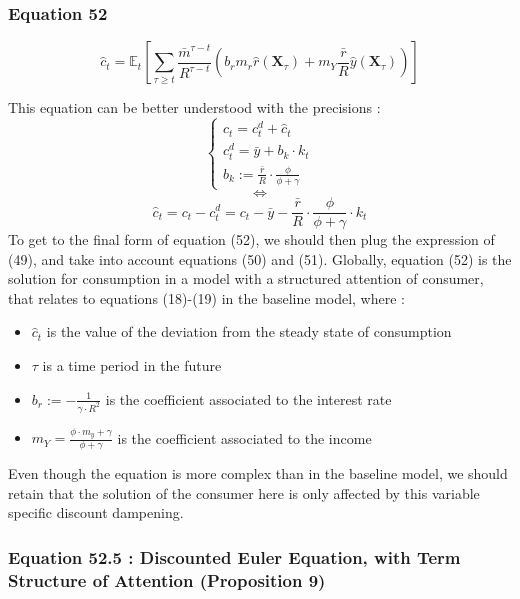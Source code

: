 \documentclass{article}
\begin{document}
\subsubsection*{Equation 52}

\begin{equation}\tag{52}
        \hat{c}_{t}=\mathbb{E}_{t}\left[\sum_{\tau\geq t}\frac{\bar{m}^{\tau-t}}{R^{\tau-t}}\left(b_{r}m_{r}\hat{r}(\textbf{X}_{\tau})+m_{Y}\frac{\bar{r}}{R}\hat{y}(\textbf{X}_{\tau})\right)\right]
\end{equation}

This equation can be better understood with the precisions : 
\begin{equation*}
    \begin{cases}
        c_{t}=c_{t}^{d}+\hat{c}_{t} \\ 
        c^{d}_{t} = \bar{y} + b_{k}\cdot k_{t} \\
        b_{k}:=\frac{\bar{r}}{R}\cdot\frac{\phi}{\phi+\gamma}
    \end{cases}
\end{equation*}
$$\iff$$
\begin{equation*}
    \hat{c}_{t}=c_{t}-c_{t}^{d}=c_{t}-\bar{y} - \frac{\bar{r}}{R}\cdot\frac{\phi}{\phi+\gamma}\cdot k_{t}
\end{equation*}
To get to the final form of equation (52), we should then plug the expression of (49), and take into account equations (50) and (51).
Globally, equation (52) is the solution for consumption in a model with a structured attention of consumer, that relates to equations (18)-(19) in the baseline model, where : 
\begin{itemize}
    \item $\hat{c}_{t}$ is the value of the deviation from the steady state of consumption
    \item $\tau$ is a time period in the future
    \item $b_{r}:=-\frac{1}{\gamma\cdot R^{2}}$ is the coefficient associated to the interest rate
    \item $m_{Y}=\frac{\phi\cdot m_{y}+\gamma}{\phi+\gamma}$ is the coefficient associated to the income
\end{itemize}

Even though the equation is more complex than in the baseline model, we should retain that the solution of the consumer here is only affected by this variable specific discount dampening. 

\subsubsection*{Equation 52.5 : Discounted Euler Equation, with Term Structure of Attention (Proposition 9)}
\end{document}
